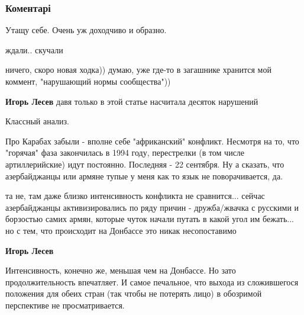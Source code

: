  
 
 
 
 
\subsubsection{Коментарі}
\label{sec:11_10_2018.fb.lesev_igor.1.ukr_voen_doktrina.cmt}

\begin{itemize} %
Утащу себе. Очень уж доходчиво и образно.

ждали.. скучали

\begin{itemize} %
ничего, скоро новая ходка)) думаю, уже где-то в загашнике хранится мой коммент, "нарушающий нормы сообщества"))

\textbf{Игорь Лесев} давя только в этой статье насчитала десяток нарушений

Классный анализ.
\end{itemize} %


Про Карабах забыли - вполне себе "африканский" конфликт. Несмотря на то, что
"горячая" фаза закончилась в 1994 году, перестрелки (в том числе
артиллерийские) идут постоянно. Последняя - 22 сентября. Ну а сказать, что
азербайджанцы или армяне тупые у меня как то язык не поворачивается, да.

\begin{itemize} %

та не, там даже близко интенсивность конфликта не сравнится... сейчас
азербайджанцы активизировались по ряду причин - дружба/жвачка с русскими и
борзостью самих армян, которые чуток начали путать в какой угол им бежать... но
с тем, что происходит на Донбассе это никак несопоставимо

\textbf{Игорь Лесев} 

Интенсивность, конечно же, меньшая чем на Донбассе. Но зато продолжительность
впечатляет. И самое печальное, что выхода из сложившегося положения для обеих
стран (так чтобы не потерять лицо) в обозримой перспективе не просматривается.


\end{itemize}
\end{itemize}
